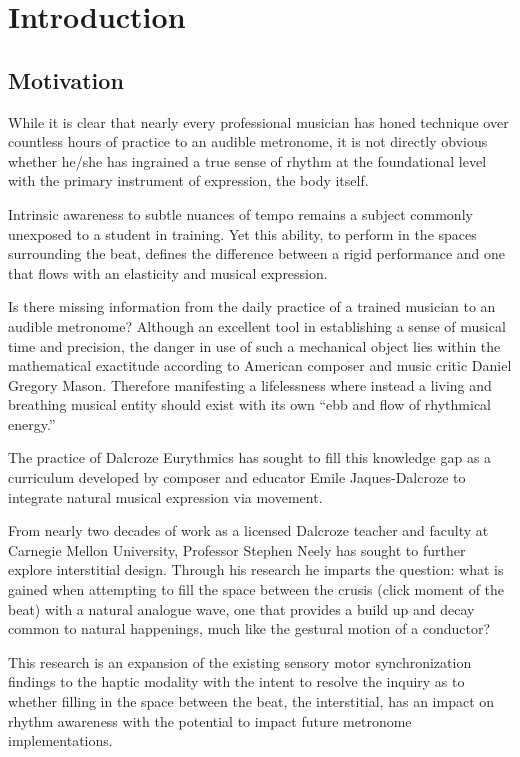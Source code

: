 
\chapter{Introduction} \label{secIntro}
\section{Motivation}
While it is clear that nearly every professional musician has honed technique over countless hours of practice to an audible metronome, it is not directly obvious whether he/she has ingrained a true sense of rhythm at the foundational level with the primary instrument of expression, the body itself.

Intrinsic awareness to subtle nuances of tempo remains a subject commonly unexposed to a student in training. Yet this ability, to perform in the spaces surrounding the beat, defines the difference between a rigid performance and one that flows with an elasticity and musical expression.

Is there missing information from the daily practice of a trained musician to an audible metronome? Although an excellent tool in establishing a sense of musical time and precision, the danger in use of such a mechanical object lies within the mathematical exactitude according to American composer and music critic Daniel Gregory Mason. Therefore manifesting a lifelessness where instead a living and breathing musical entity should exist with its own ``ebb and flow of rhythmical energy.''\cite{fitts2008new}

The practice of Dalcroze Eurythmics has sought to fill this knowledge gap as a curriculum developed by composer and educator Emile Jaques-Dalcroze to integrate natural musical expression via movement.  

From nearly two decades of work as a licensed Dalcroze teacher and faculty at Carnegie Mellon University, Professor Stephen Neely has sought to further explore interstitial design. Through his research he imparts the question: what is gained when attempting to fill the space between the crusis (click moment of the beat) with a natural analogue wave, one that provides a build up and decay common to natural happenings, much like the gestural motion of a conductor?

This research is an expansion of the existing sensory motor synchronization findings to the haptic modality with the intent to resolve the inquiry as to whether filling in the space between the beat, the interstitial, has an impact on rhythm awareness with the potential to impact future metronome implementations. 

